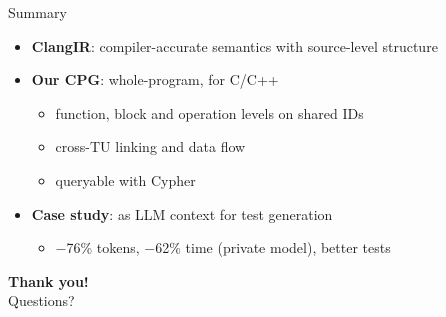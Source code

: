 \documentclass[aspectratio=169,10pt]{beamer}
\begin{document}
\begin{frame}{Summary}
  \begin{itemize}
    \item \textbf{ClangIR}: compiler-accurate semantics with source-level structure
    \item \textbf{Our CPG}: whole-program, for C/C++
          \begin{itemize}
            \item function, block and operation levels on shared IDs
            \item cross-TU linking and data flow
            \item queryable with Cypher
          \end{itemize}
    \item \textbf{Case study}: as LLM context for test generation
          \begin{itemize}
            \item $-$76\% tokens, $-$62\% time (private model), better tests
          \end{itemize}
  \end{itemize}

  \vspace{1.5em}
  \centering
  {\Large \textbf{Thank you!}}\\[0.4em]
  Questions?
\end{frame}
\end{document}
